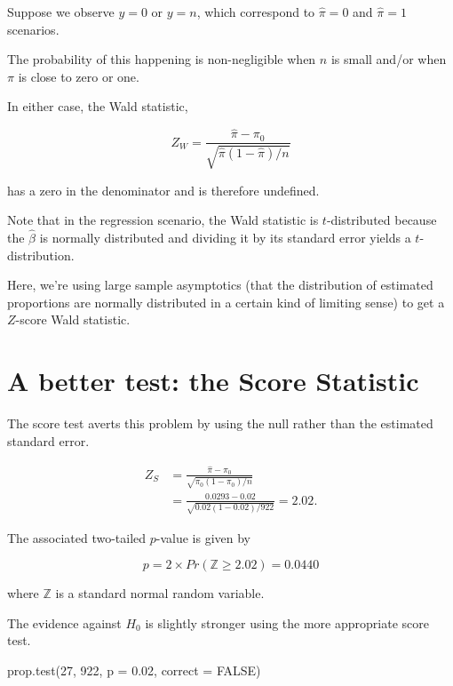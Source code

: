 \documentclass[
  letterpaper,
  DIV=11,
  numbers=noendperiod]{scrreport}
\newenvironment{Shaded}{\begin{snugshade}}{\end{snugshade}}
\newcommand{\AttributeTok}[1]{\textcolor[rgb]{0.40,0.45,0.13}{#1}}
\newcommand{\ConstantTok}[1]{\textcolor[rgb]{0.56,0.35,0.01}{#1}}
\newcommand{\DecValTok}[1]{\textcolor[rgb]{0.68,0.00,0.00}{#1}}
\newcommand{\FloatTok}[1]{\textcolor[rgb]{0.68,0.00,0.00}{#1}}
\newcommand{\FunctionTok}[1]{\textcolor[rgb]{0.28,0.35,0.67}{#1}}
\newcommand{\NormalTok}[1]{\textcolor[rgb]{0.00,0.23,0.31}{#1}}
\begin{document}
Suppose we observe \(y = 0\) or \(y = n\), which correspond to
\(\hat \pi = 0\) and \(\hat \pi = 1\) scenarios.

The probability of this happening is non-negligible when \(n\) is small
and/or when \(\pi\) is close to zero or one.

In either case, the Wald statistic,

\[
Z_W = \frac{\hat \pi - \pi_0} { \sqrt{\hat \pi ( 1 - \hat \pi ) / n }}
\]

has a zero in the denominator and is therefore undefined.

Note that in the regression scenario, the Wald statistic is
\(t\)-distributed because the \(\hat \beta\) is normally distributed and
dividing it by its standard error yields a \(t\)-distribution.

Here, we're using large sample asymptotics (that the distribution of
estimated proportions are normally distributed in a certain kind of
limiting sense) to get a \(Z\)-score Wald statistic.

\hypertarget{a-better-test-the-score-statistic}{%
\section{A better test: the Score
Statistic}\label{a-better-test-the-score-statistic}}

The score test averts this problem by using the null rather than the
estimated standard error.

\[
\begin{aligned}
Z_S & = \frac{\hat \pi - \pi_0}{\sqrt{\pi_0 ( 1- \pi_0)/n}} \\ 
& = \frac{0.0293 − 0.02}{\sqrt{0.02(1 − 0.02)/922}} = 2.02.
\end{aligned}
\]

The associated two-tailed \(p\)-value is given by

\[
p = 2 \times Pr(\mathbb Z \geq 2.02) = 0.0440
\]

where \(\mathbb Z\) is a standard normal random variable.

The evidence against \(H_0\) is slightly stronger using the more
appropriate score test.

\begin{Shaded}
\begin{Highlighting}[]
\FunctionTok{prop.test}\NormalTok{(}\DecValTok{27}\NormalTok{, }\DecValTok{922}\NormalTok{, }\AttributeTok{p =} \FloatTok{0.02}\NormalTok{, }\AttributeTok{correct =} \ConstantTok{FALSE}\NormalTok{)}
\end{Highlighting}
\end{Shaded}
\end{document}
